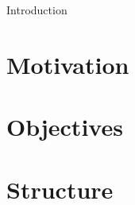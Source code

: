 Introduction

\section{Motivation}
\label{sec:motivation}


\section{Objectives}
\label{sec:objectives}


\section{Structure}

